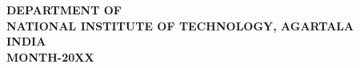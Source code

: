 \begin{center}
{\centering {} \par}
\end{center}
\vspace{-0.5pt}
\large
\begin{center}
{\bf DEPARTMENT OF }\\
{\bf NATIONAL INSTITUTE OF TECHNOLOGY, AGARTALA}\\
{\bf INDIA}\\
{\bf  MONTH-20XX}\\ 
\end{center}


